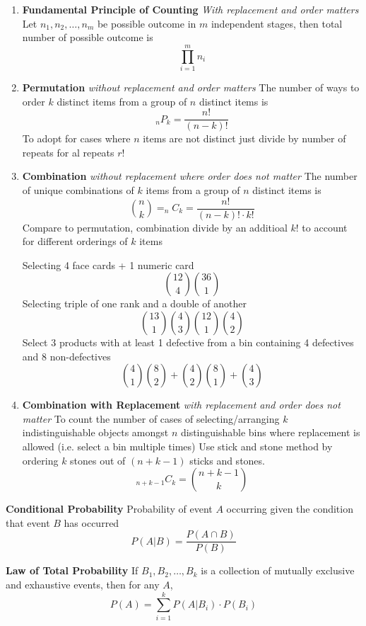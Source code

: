\documentclass[11pt]{article}
\begin{document}
\begin{enumerate}
  \item \textbf{Fundamental Principle of Counting} \textit{With replacement and order matters}
   Let $n_1, n_2, \dots, n_m$ be possible outcome in $m$ independent stages, then total number of possible outcome is
   \[
    \prod_{i=1}^m n_i
   \]
 \item \textbf{Permutation} \textit{without replacement and order matters} The number of ways to order $k$ distinct items from a group of $n$ distinct items is
 \[
  _{n}P_{k} = \frac{n!}{(n-k)!}
 \]
 To adopt for cases where $n$ items are not distinct just divide by number of repeats for al repeats $r!$
 \item \textbf{Combination} \textit{without replacement where order does not matter} The number of unique combinations of $k$ items from a group of $n$ distinct items is
 \[
  \binom{n}{k} = _{n}C_{k} = \frac{n!}{(n-k)! \cdot k!}
 \]
 Compare to permutation, combination divide by an additioal $k!$ to account for different orderings of $k$ items
 \begin{rem}
   Selecting 4 face cards + 1 numeric card
   \[
    \binom{12}{4}\binom{36}{1}
   \]
   Selecting triple of one rank and a double of another
   \[
    \binom{13}{1}\binom{4}{3}\binom{12}{1}\binom{4}{2}
   \]
   Select 3 products with at least 1 defective from a bin containing 4 defectives and 8 non-defectives
   \[
    \binom{4}{1}\binom{8}{2} + \binom{4}{2}\binom{8}{1} + \binom{4}{3}
   \]
 \end{rem}
 \item \textbf{Combination with Replacement} \textit{with replacement and order does not matter} To count the number of cases of selecting/arranging $k$ indistinguishable objects amongst $n$ distinguishable bins where replacement is allowed (i.e. select a bin multiple times) Use stick and stone method by ordering $k$ stones out of $(n+k-1)$ sticks and stones.
 \[
  _{n+k-1}C_{k} = \binom{n+k-1}{k}
 \]
\end{enumerate}


\begin{defn}
  \textbf{Conditional Probability}
  Probability of event $A$ occurring given the condition that event $B$ has occurred
  \[
    P(A|B) = \frac{P(A\cap B)}{P(B)}
  \]
\end{defn}

\begin{theorem}
  \textbf{Law of Total Probability} If $B_1, B_2, \dots, B_k$ is a collection of mutually exclusive and exhaustive events, then for any $A$,
  \[
    P(A) = \sum_{i=1}^k P(A|B_i) \cdot P(B_i)
  \]
\end{theorem}
\end{document}
